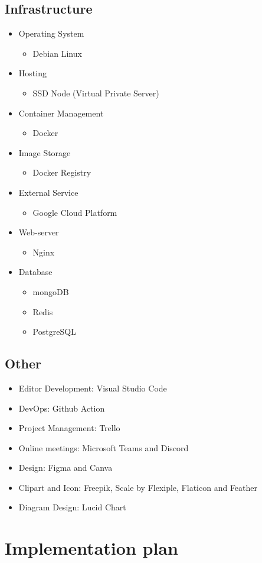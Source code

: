\subsection{Infrastructure}
\begin{itemize}
	\item Operating System
	\begin{itemize}
		\item Debian Linux
	\end{itemize}
	\item Hosting
	\begin{itemize}
		\item SSD Node (Virtual Private Server)
	\end{itemize}
	\item Container Management
	\begin{itemize}
		\item Docker
	\end{itemize}
	\item Image Storage
	\begin{itemize}
		\item Docker Registry
	\end{itemize}
	\item External Service
	\begin{itemize}
		\item Google Cloud Platform
	\end{itemize}
	\item Web-server
	\begin{itemize}
		\item Nginx
	\end{itemize}
	\item Database
	\begin{itemize}
		\item mongoDB
		\item Redis
		\item PostgreSQL
	\end{itemize}
\end{itemize}
\subsection{Other}
\begin{itemize}
	\item Editor Development: Visual Studio Code
	\item DevOps: Github Action
	\item Project Management: Trello
	\item Online meetings: Microsoft Teams and Discord
	\item Design: Figma and Canva
	\item Clipart and Icon: Freepik, Scale by Flexiple, Flaticon and Feather
	\item Diagram Design: Lucid Chart
\end{itemize}
\newpage
\section{Implementation plan}